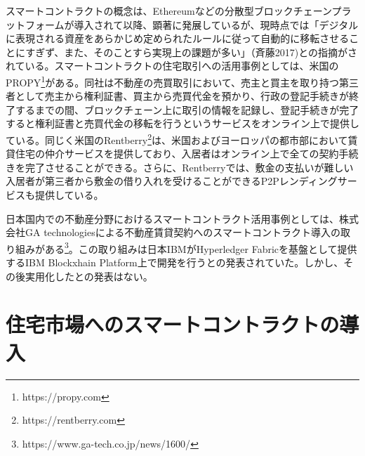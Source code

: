 \documentclass[a4paper,fontsize=11pt,report,notitlepage,line_length=38zw,number_of_lines=40]{jlreq}
\begin{document}
スマートコントラクトの概念は、Ethereumなどの分散型ブロックチェーンプラットフォームが導入されて以降、顕著に発展しているが、現時点では「デジタルに表現される資産をあらかじめ定められたルールに従って自動的に移転させることにすぎず、また、そのことすら実現上の課題が多い」（斉藤2017)\cite{saito2017}との指摘がされている。スマートコントラクトの住宅取引への活用事例としては、米国のPROPY\footnote{https://propy.com}がある。同社は不動産の売買取引において、売主と買主を取り持つ第三者として売主から権利証書、買主から売買代金を預かり、行政の登記手続きが終了するまでの間、ブロックチェーン上に取引の情報を記録し、登記手続きが完了すると権利証書と売買代金の移転を行うというサービスをオンライン上で提供している。同じく米国のRentberry\footnote{https://rentberry.com}は、米国およびヨーロッパの都市部において賃貸住宅の仲介サービスを提供しており、入居者はオンライン上で全ての契約手続きを完了させることができる。さらに、Rentberryでは、敷金の支払いが難しい入居者が第三者から敷金の借り入れを受けることができるP2Pレンディングサービスも提供している。

日本国内での不動産分野におけるスマートコントラクト活用事例としては、株式会社GA technologiesによる不動産賃貸契約へのスマートコントラクト導入の取り組みがある\footnote{https://www.ga-tech.co.jp/news/1600/}。この取り組みは日本IBMがHyperledger Fabricを基盤として提供するIBM Blockxhain Platform上で開発を行うとの発表されていた。しかし、その後実用化したとの発表はない。


\chapter{住宅市場へのスマートコントラクトの導入}
\end{document}
